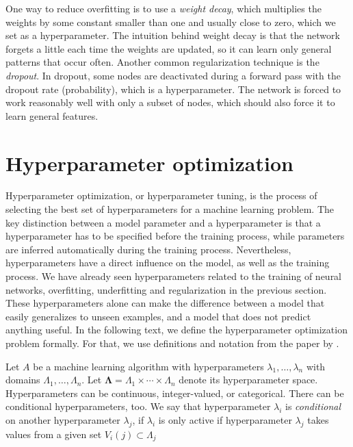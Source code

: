 One way to reduce overfitting is to use a \textit{weight decay}, which multiplies the weights by some constant smaller than one and usually close to zero, which we set as a hyperparameter. The intuition behind weight decay is that the network forgets a little each time the weights are updated, so it can learn only general patterns that occur often. Another common regularization technique is the \textit{dropout}. In dropout, some nodes are deactivated during a forward pass with the dropout rate (probability), which is a hyperparameter. The network is forced to work reasonably well with only a subset of nodes, which should also force it to learn general features.


\section{Hyperparameter optimization} \label{sec:hpo}
Hyperparameter optimization, or hyperparameter tuning, is the process of selecting the best set of hyperparameters for a machine learning problem. The key distinction between a model parameter and a hyperparameter is that a hyperparameter has to be specified before the training process, while parameters are inferred automatically during the training process. Nevertheless, hyperparameters have a direct influence on the model, as well as the training process. We have already seen hyperparameters related to the training of neural networks, overfitting, underfitting and regularization in the previous section. These hyperparameters alone can make the difference between a model that easily generalizes to unseen examples, and a model that does not predict anything useful. In the following text, we define the hyperparameter optimization problem formally. For that, we use definitions and notation from the paper by \citet{eggensperger2013towards}.

Let $A$ be a machine learning algorithm with hyperparameters $\lambda_1, \dots , \lambda_n$ with domains $\Lambda_1,\dots , \Lambda_n$. Let $ \mathbf{\Lambda } = \Lambda_1 \times \cdots \times \Lambda_n$ denote its hyperparameter space. Hyperparameters can be continuous, integer-valued, or categorical. There can be conditional hyperparameters, too. We say that hyperparameter $\lambda_i$ is \emph{conditional} on another hyperparameter $\lambda_j$, if $\lambda_i$ is only active if hyperparameter $\lambda_j$ takes values from a given set $V_i(j) \subset \Lambda_j$

